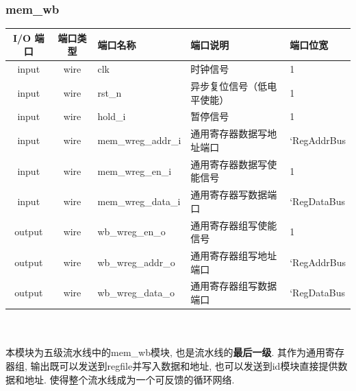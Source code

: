 \documentclass[lang=cn,11pt,a4paper,chinesefont=founder]{elegantpaper}
\begin{document}
\subsubsection{mem\_wb}
\begin{tabular}{cclll}
    \toprule
    I/O 端口 & 端口类型 & 端口名称           & 端口说明                   & 端口位宽    \\
    \midrule
    input    & wire     & clk                & 时钟信号                   & 1           \\
    input    & wire     & rst\_n             & 异步复位信号（低电平使能） & 1           \\
    input    & wire     & hold\_i            & 暂停信号                   & 1           \\

    input    & wire     & mem\_wreg\_addr\_i & 通用寄存器数据写地址端口   & `RegAddrBus \\
    input    & wire     & mem\_wreg\_en\_i   & 通用寄存器数据写使能信号   & 1           \\
    input    & wire     & mem\_wreg\_data\_i & 通用寄存器写数据端口       & `RegDataBus \\

    output   & wire     & wb\_wreg\_en\_o    & 通用寄存器组写使能信号     & 1           \\
    output   & wire     & wb\_wreg\_addr\_o  & 通用寄存器组写地址端口     & `RegAddrBus \\
    output   & wire     & wb\_wreg\_data\_o  & 通用寄存器组写数据端口     & `RegDataBus \\
    \bottomrule
\end{tabular}\\
\\
本模块为五级流水线中的mem\_wb模块, 也是流水线的\textbf{最后一级}. 其作为通用寄存器组, 输出既可以发送到regfile并写入数据和地址, 也可以发送到id模块直接提供数据和地址. 使得整个流水线成为一个可反馈的循环网络. 
\end{document}
